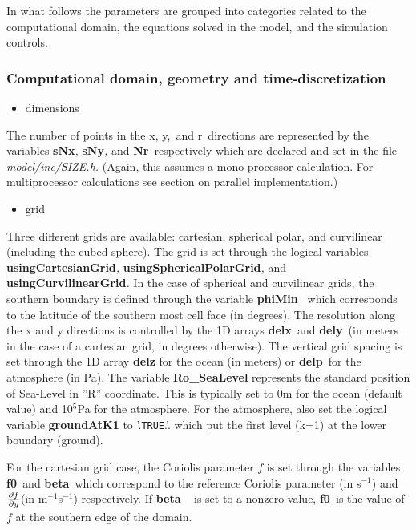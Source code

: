 In what follows the parameters are grouped into categories related to the
computational domain, the equations solved in the model, and the simulation
controls.

\subsubsection{Computational domain, geometry and time-discretization}

\begin{itemize}
\item dimensions
\end{itemize}

The number of points in the x, y,\textit{\ }and r\textit{\ }directions are
represented by the variables \textbf{sNx}\textit{, }\textbf{sNy}\textit{, }%
and \textbf{Nr}\textit{\ }respectively which are declared and set in the
file \textit{model/inc/SIZE.h. }(Again, this assumes a mono-processor
calculation. For multiprocessor calculations see section on parallel
implementation.)

\begin{itemize}
\item grid
\end{itemize}

Three different grids are available: cartesian, spherical polar, and
curvilinear (including the cubed sphere). The grid is set through the
logical variables \textbf{usingCartesianGrid}\textit{, }\textbf{%
usingSphericalPolarGrid}\textit{, }and \textit{\ }\textbf{%
usingCurvilinearGrid}\textit{. }In the case of spherical and curvilinear
grids, the southern boundary is defined through the variable \textbf{phiMin}%
\textit{\ }which corresponds to the latitude of the southern most cell face
(in degrees). The resolution along the x and y directions is controlled by
the 1D arrays \textbf{delx}\textit{\ }and \textbf{dely}\textit{\ }(in meters
in the case of a cartesian grid, in degrees otherwise). The vertical grid
spacing is set through the 1D array \textbf{delz }for the ocean (in meters)
or \textbf{delp}\textit{\ }for the atmosphere (in Pa). The variable \textbf{%
Ro\_SeaLevel} represents the standard position of Sea-Level in ''R''
coordinate. This is typically set to 0m for the ocean (default value) and 10$%
^{5}$Pa for the atmosphere. For the atmosphere, also set the logical
variable \textbf{groundAtK1} to '.\texttt{TRUE}.'. which put the first level
(k=1) at the lower boundary (ground).

For the cartesian grid case, the Coriolis parameter $f$ is set through the
variables \textbf{f0}\textit{\ }and \textbf{beta}\textit{\ }which correspond
to the reference Coriolis parameter (in s$^{-1}$) and $\frac{\partial f}{%
\partial y}$(in m$^{-1}$s$^{-1}$) respectively. If \textbf{beta }\textit{\ }%
is set to a nonzero value, \textbf{f0}\textit{\ }is the value of $f$ at the
southern edge of the domain.

